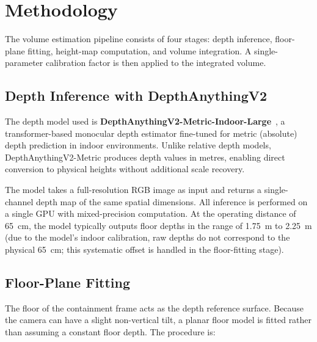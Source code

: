 \documentclass[11pt,a4paper]{article}
\begin{document}
\section{Methodology}
\label{sec:method}

The volume estimation pipeline consists of four stages: depth inference, floor-plane fitting,
height-map computation, and volume integration. A single-parameter calibration factor is
then applied to the integrated volume.

\subsection{Depth Inference with DepthAnythingV2}

The depth model used is \textbf{DepthAnythingV2-Metric-Indoor-Large}~\cite{depth_anything_v2},
a transformer-based monocular depth estimator fine-tuned for metric (absolute) depth prediction
in indoor environments. Unlike relative depth models, DepthAnythingV2-Metric produces depth
values in metres, enabling direct conversion to physical heights without additional scale recovery.

The model takes a full-resolution RGB image as input and returns a single-channel depth map
of the same spatial dimensions. All inference is performed on a single GPU with mixed-precision
computation. At the operating distance of 65~cm, the model typically outputs floor depths in
the range of 1.75~m to 2.25~m (due to the model's indoor calibration, raw depths do not
correspond to the physical 65~cm; this systematic offset is handled in the floor-fitting stage).

\subsection{Floor-Plane Fitting}

The floor of the containment frame acts as the depth reference surface. Because the camera
can have a slight non-vertical tilt, a planar floor model is fitted rather than assuming a
constant floor depth. The procedure is:
\end{document}
